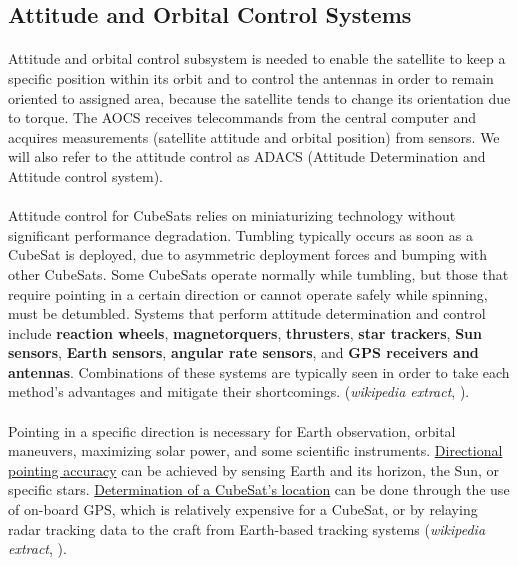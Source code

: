 \subsection{Attitude and Orbital Control Systems}

\paragraph{}Attitude and orbital control subsystem is needed to enable the satellite to keep a specific position within its orbit and to control the antennas in order to remain oriented to assigned area, because the satellite tends to change its orientation due to torque. The AOCS receives telecommands from the central computer and acquires measurements (satellite attitude and orbital position) from sensors. We will also refer to the attitude control as ADACS (Attitude Determination and Attitude control system).

\paragraph{} Attitude control for CubeSats relies on miniaturizing technology without significant performance degradation. Tumbling typically occurs as soon as a CubeSat is deployed, due to asymmetric deployment forces and bumping with other CubeSats. Some CubeSats operate normally while tumbling, but those that require pointing in a certain direction or cannot operate safely while spinning, must be detumbled. Systems that perform attitude determination and control include \textbf{reaction wheels}, \textbf{magnetorquers}, \textbf{thrusters}, \textbf{star trackers}, \textbf{Sun sensors}, \textbf{Earth sensors}, \textbf{angular rate sensors}, and \textbf{GPS receivers and antennas}. Combinations of these systems are typically seen in order to take each method's advantages and mitigate their shortcomings. (\textit{wikipedia extract}, \cite{Macdonald2014}). 

\paragraph{} Pointing in a specific direction is necessary for Earth observation, orbital maneuvers, maximizing solar power, and some scientific instruments. \underline{Directional pointing accuracy} can be achieved by sensing Earth and its horizon, the Sun, or specific stars. \underline{Determination of a CubeSat's location} can be done through the use of on-board GPS, which is relatively expensive for a CubeSat, or by relaying radar tracking data to the craft from Earth-based tracking systems (\textit{wikipedia extract}, \cite{Macdonald2014}).

